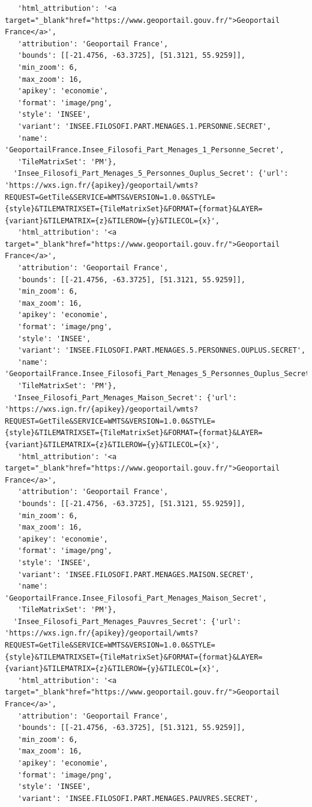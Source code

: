 \documentclass[
  letterpaper,
  DIV=11,
  numbers=noendperiod]{scrreprt}
\begin{document}
\begin{verbatim}
   'html_attribution': '<a target="_blank"href="https://www.geoportail.gouv.fr/">Geoportail France</a>',
   'attribution': 'Geoportail France',
   'bounds': [[-21.4756, -63.3725], [51.3121, 55.9259]],
   'min_zoom': 6,
   'max_zoom': 16,
   'apikey': 'economie',
   'format': 'image/png',
   'style': 'INSEE',
   'variant': 'INSEE.FILOSOFI.PART.MENAGES.1.PERSONNE.SECRET',
   'name': 'GeoportailFrance.Insee_Filosofi_Part_Menages_1_Personne_Secret',
   'TileMatrixSet': 'PM'},
  'Insee_Filosofi_Part_Menages_5_Personnes_Ouplus_Secret': {'url': 'https://wxs.ign.fr/{apikey}/geoportail/wmts?REQUEST=GetTile&SERVICE=WMTS&VERSION=1.0.0&STYLE={style}&TILEMATRIXSET={TileMatrixSet}&FORMAT={format}&LAYER={variant}&TILEMATRIX={z}&TILEROW={y}&TILECOL={x}',
   'html_attribution': '<a target="_blank"href="https://www.geoportail.gouv.fr/">Geoportail France</a>',
   'attribution': 'Geoportail France',
   'bounds': [[-21.4756, -63.3725], [51.3121, 55.9259]],
   'min_zoom': 6,
   'max_zoom': 16,
   'apikey': 'economie',
   'format': 'image/png',
   'style': 'INSEE',
   'variant': 'INSEE.FILOSOFI.PART.MENAGES.5.PERSONNES.OUPLUS.SECRET',
   'name': 'GeoportailFrance.Insee_Filosofi_Part_Menages_5_Personnes_Ouplus_Secret',
   'TileMatrixSet': 'PM'},
  'Insee_Filosofi_Part_Menages_Maison_Secret': {'url': 'https://wxs.ign.fr/{apikey}/geoportail/wmts?REQUEST=GetTile&SERVICE=WMTS&VERSION=1.0.0&STYLE={style}&TILEMATRIXSET={TileMatrixSet}&FORMAT={format}&LAYER={variant}&TILEMATRIX={z}&TILEROW={y}&TILECOL={x}',
   'html_attribution': '<a target="_blank"href="https://www.geoportail.gouv.fr/">Geoportail France</a>',
   'attribution': 'Geoportail France',
   'bounds': [[-21.4756, -63.3725], [51.3121, 55.9259]],
   'min_zoom': 6,
   'max_zoom': 16,
   'apikey': 'economie',
   'format': 'image/png',
   'style': 'INSEE',
   'variant': 'INSEE.FILOSOFI.PART.MENAGES.MAISON.SECRET',
   'name': 'GeoportailFrance.Insee_Filosofi_Part_Menages_Maison_Secret',
   'TileMatrixSet': 'PM'},
  'Insee_Filosofi_Part_Menages_Pauvres_Secret': {'url': 'https://wxs.ign.fr/{apikey}/geoportail/wmts?REQUEST=GetTile&SERVICE=WMTS&VERSION=1.0.0&STYLE={style}&TILEMATRIXSET={TileMatrixSet}&FORMAT={format}&LAYER={variant}&TILEMATRIX={z}&TILEROW={y}&TILECOL={x}',
   'html_attribution': '<a target="_blank"href="https://www.geoportail.gouv.fr/">Geoportail France</a>',
   'attribution': 'Geoportail France',
   'bounds': [[-21.4756, -63.3725], [51.3121, 55.9259]],
   'min_zoom': 6,
   'max_zoom': 16,
   'apikey': 'economie',
   'format': 'image/png',
   'style': 'INSEE',
   'variant': 'INSEE.FILOSOFI.PART.MENAGES.PAUVRES.SECRET',

\end{verbatim}
\end{document}
